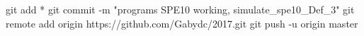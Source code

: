 git add *
git commit -m "programs SPE10 working, simulate_spe10_Def_3"
git remote add origin https://github.com/Gabydc/2017.git
git push -u origin master
